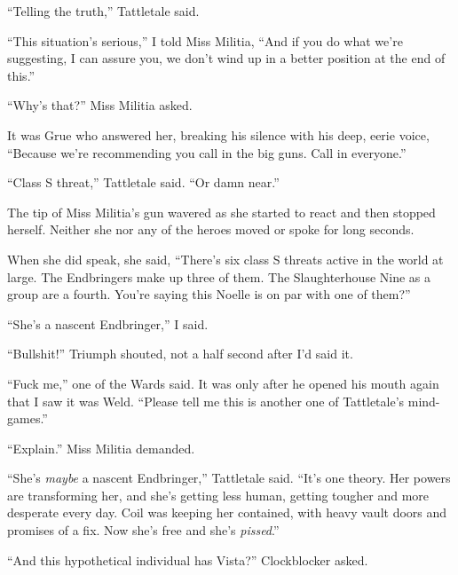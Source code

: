 ``Telling the truth,'' Tattletale said.



``This situation's serious,'' I told Miss Militia, ``And if you do what we're suggesting, I can assure you, we don't wind up in a better position at the end of this.''



``Why's that?'' Miss Militia asked.



It was Grue who answered her, breaking his silence with his deep, eerie voice, ``Because we're recommending you call in the big guns.  Call in everyone.''



``Class S threat,'' Tattletale said.  ``Or damn near.''



The tip of Miss Militia's gun wavered as she started to react and then stopped herself.  Neither she nor any of the heroes moved or spoke for long seconds.



When she did speak, she said, ``There's six class S threats active in the world at large.  The Endbringers make up three of them.  The Slaughterhouse Nine as a group are a fourth.  You're saying this Noelle is on par with one of them?''



``She's a nascent Endbringer,'' I said.



``Bullshit!''  Triumph shouted, not a half second after I'd said it.



``Fuck me,'' one of the Wards said.  It was only after he opened his mouth again that I saw it was Weld.  ``Please tell me this is another one of Tattletale's mind-games.''



``Explain.'' Miss Militia demanded.



``She's \emph{maybe} a nascent Endbringer,'' Tattletale said.  ``It's one theory.  Her powers are transforming her, and she's getting less human, getting tougher and more desperate every day.  Coil was keeping her contained, with heavy vault doors and promises of a fix.  Now she's free and she's \emph{pissed}.''



``And this hypothetical individual has Vista?'' Clockblocker asked.



